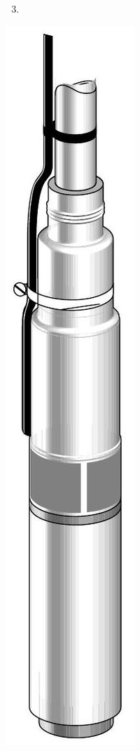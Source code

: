 \documentclass[10pt]{article}
\begin{document}
\begin{enumerate}
  \setcounter{enumi}{2}
  \item 
\end{enumerate}
\includegraphics[max width=\textwidth]{2022_11_03_65aa625ded296bdfd01fg-23(2)}
\end{document}
